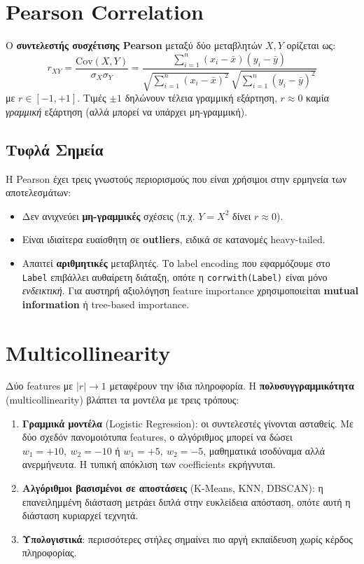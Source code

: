 \documentclass[12pt,a4paper,twoside]{book}
\begin{document}
\section{Pearson Correlation}

Ο \textbf{συντελεστής συσχέτισης Pearson} μεταξύ δύο μεταβλητών \(X, Y\)
ορίζεται ως:
\begin{equation}
    r_{XY} = \frac{\mathrm{Cov}(X, Y)}{\sigma_X \sigma_Y}
           = \frac{\sum_{i=1}^{n}(x_i-\bar x)(y_i-\bar y)}
                  {\sqrt{\sum_{i=1}^{n}(x_i-\bar x)^2}\,
                   \sqrt{\sum_{i=1}^{n}(y_i-\bar y)^2}}
\end{equation}
με \(r \in [-1, +1]\). Τιμές \(\pm 1\) δηλώνουν τέλεια γραμμική εξάρτηση,
\(r \approx 0\) καμία \emph{γραμμική} εξάρτηση (αλλά μπορεί να υπάρχει
μη-γραμμική).

\subsection{Τυφλά Σημεία}

Η Pearson έχει τρεις γνωστούς περιορισμούς που είναι χρήσιμοι στην ερμηνεία
των αποτελεσμάτων:
\begin{itemize}
    \item Δεν ανιχνεύει \textbf{μη-γραμμικές} σχέσεις (π.χ.
    \(Y = X^2\) δίνει \(r \approx 0\)).
    \item Είναι ιδιαίτερα ευαίσθητη σε \textbf{outliers}, ειδικά σε
    κατανομές heavy-tailed.
    \item Απαιτεί \textbf{αριθμητικές} μεταβλητές. Το label encoding που
    εφαρμόζουμε στο \texttt{Label} επιβάλλει αυθαίρετη διάταξη, οπότε
    η \texttt{corrwith(Label)} είναι μόνο \textit{ενδεικτική}. Για
    αυστηρή αξιολόγηση feature importance χρησιμοποιείται
    \textbf{mutual information} ή tree-based importance.
\end{itemize}

\section{Multicollinearity}

Δύο features με \(|r| \to 1\) μεταφέρουν την ίδια πληροφορία. Η
\textbf{πολυσυγγραμμικότητα} (multicollinearity) βλάπτει τα μοντέλα με τρεις
τρόπους:

\begin{enumerate}
    \item \textbf{Γραμμικά μοντέλα} (Logistic Regression): οι συντελεστές
    γίνονται ασταθείς. Με δύο σχεδόν πανομοιότυπα features, ο αλγόριθμος
    μπορεί να δώσει \(w_1=+10,\ w_2=-10\) ή \(w_1=+5,\ w_2=-5\),
    μαθηματικά ισοδύναμα αλλά ανερμήνευτα. Η τυπική απόκλιση των
    coefficients εκρήγνυται.
    \item \textbf{Αλγόριθμοι βασισμένοι σε αποστάσεις} (K-Means, KNN,
    DBSCAN): η επανειλημμένη διάσταση μετράει διπλά στην ευκλείδεια
    απόσταση, οπότε αυτή η διάσταση κυριαρχεί τεχνητά.
    \item \textbf{Υπολογιστικά}: περισσότερες στήλες σημαίνει πιο αργή
    εκπαίδευση χωρίς κέρδος πληροφορίας.
\end{enumerate}
\end{document}
